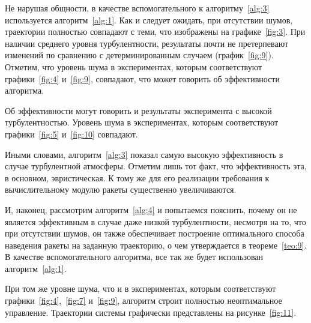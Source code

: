 Не нарушая общности, в качестве вспомогательного к алгоритму~\ref{alg:3} используется алгоритм~\ref{alg:1}. Как и следует ожидать, при отсутствии шумов, траектории полностью совпадают с теми, что изображены на графике~\ref{fig:3}. При наличии среднего уровня турбулентности, результаты почти не претерпевают изменений по сравнению с детерминированным случаем (график~\ref{fig:9}). Отметим, что уровень шума в экспериментах, которым соответствуют графики~\ref{fig:4} и~\ref{fig:9}, совпадают, что может говорить об эффективности алгоритма.


Об эффективности могут говорить и результаты эксперимента с высокой турбулентностью. Уровень шума в экспериментах, которым соответствуют графики~\vref{fig:5} и~\ref{fig:10} совпадают.


Иными словами, алгоритм~\ref{alg:3} показал самую высокую эффективность в случае турбулентной атмосферы. Отметим лишь тот факт, что эффективность эта, в основном, эвристическая. К тому же для его реализации требования к вычислительному модулю ракеты существенно увеличиваются.

\br

И, наконец, рассмотрим алгоритм~\ref{alg:4} и попытаемся пояснить, почему он не является эффективным в случае даже низкой турбулентности, несмотря на то, что при отсутствии шумов, он также обеспечивает построение оптимального способа наведения ракеты на заданную траекторию, о чем утверждается в теореме~\vref{teo:9}. В качестве вспомогательного алгоритма, все так же будет использован алгоритм~\ref{alg:1}.

При том же уровне шума, что и в экспериментах, которым соответствуют графики~\ref{fig:4},~\vref{fig:7} и~\ref{fig:9}, алгоритм строит полностью неоптимальное управление. Траектории системы графически представлены на рисунке~\ref{fig:11}.


